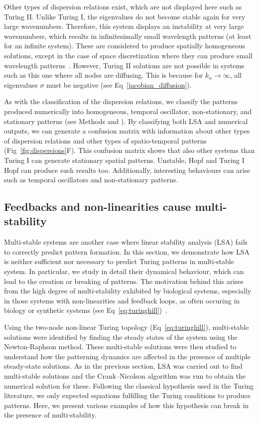\documentclass[10pt,letterpaper]{article}
\begin{document}
Other types of dispersion relations exist, which are not displayed here such as Turing II. Unlike Turing I, the eigenvalues do not become stable again for very large wavenumbers.
Therefore, this system displays an instability at very large wavenumbers, which results in infinitesimally small wavelength patterns (at least for an infinite system). These are considered to produce spatially homogeneous solutions, except in the case of space discretization where they can produce small wavelength patterns~\parencite{Wang2022}.
However, Turing II solutions are not possible in systems such as this one where all nodes are diffusing.
This is because for $k_n \rightarrow \infty$, all eigenvalues $\sigma$ must be negative (see Eq~\ref{jacobian_diffusion}).

As with the classification of the dispersion relations, we classify the patterns produced numerically into homogeneous, temporal oscillator, non-stationary, and stationary patterns (see Methods and ).
By classifying both LSA and numerical outputs, we can generate a confusion matrix with information about other types of dispersion relations and other types of spatio-temporal patterns (Fig~\ref{fig:dispersions}F). This confusion matrix shows that also other systems than Turing I can generate stationary spatial patterns. Unstable, Hopf and Turing I Hopf can produce such results too. Additionally, interesting behaviours can arise such as temporal oscillators and non-stationary patterns.


\subsection*{Feedbacks and non-linearities cause multi-stability}

Multi-stable systems are another case where linear stability analysis (LSA) fails to correctly predict pattern formation.  In this section, we demonstrate how LSA is neither sufficient 
nor necessary to predict Turing patterns in multi-stable system. In particular, we study in detail their dynamical behaviour, which can lead to the creation or breaking of patterns.
The motivation behind this arises from the high degree of multi-stability exhibited by biological systems, especially in those systems with non-linearities and feedback loops, as often occuring in biology or synthetic systems (see Eq~\ref{eq:turinghill})~\parencite{pham2020complexity, leite2009multistability}.

Using the two-node non-linear Turing topology (Eq~\ref{eq:turinghill}), multi-stable solutions were identified by finding the steady states of the system using the Newton-Raphson method. These multi-stable solutions were then studied to understand how the patterning dynamics are affected in the presence of multiple steady-state solutions.
As in the previous section, LSA was carried out to find multi-stable solutions and the Crank–Nicolson algorithm was run to obtain the numerical solution for these.
Following the classical hypothesis used in the Turing literature, we only expected equations fulfilling the Turing conditions to produce patterns.
Here, we present various examples of how this hypothesis can break in the presence of multi-stability.
\end{document}
